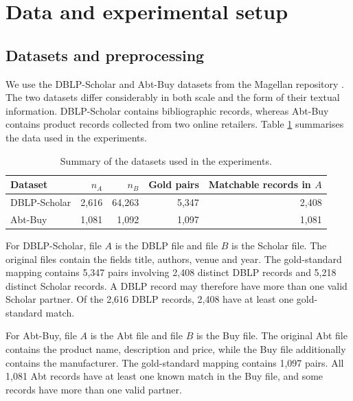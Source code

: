 \section{Data and experimental setup}
\label{sec:experimental-setup}

\subsection{Datasets and preprocessing}
\label{sec:data}

We use the DBLP-Scholar and Abt-Buy datasets from the Magellan repository
\citep{konda2016magellan}. The two datasets differ considerably in both scale and
the form of their textual information. DBLP-Scholar contains bibliographic records,
whereas Abt-Buy contains product records collected from two online retailers.
Table \ref{tab:dataset-summary} summarises the data used in the experiments.

\begin{table}[ht]
\centering
\caption{Summary of the datasets used in the experiments.}
\begin{tabular}{lrrrr}
\toprule
Dataset & $n_A$ & $n_B$ & Gold pairs & Matchable records in $A$ \\
\midrule
DBLP-Scholar & 2,616 & 64,263 & 5,347 & 2,408 \\
Abt-Buy      & 1,081 & 1,092  & 1,097 & 1,081 \\
\bottomrule
\end{tabular}
\label{tab:dataset-summary}
\end{table}

For DBLP-Scholar, file $A$ is the DBLP file and file $B$ is the Scholar
file. The original files contain the fields title, authors, venue and year.
The gold-standard mapping contains 5,347 pairs involving 2,408 distinct
DBLP records and 5,218 distinct Scholar records. A DBLP record may therefore
have more than one valid Scholar partner. Of the 2,616 DBLP records, 2,408
have at least one gold-standard match.

For Abt-Buy, file $A$ is the Abt file and file $B$ is the Buy file. The
original Abt file contains the product name, description and price, while the
Buy file additionally contains the manufacturer. The gold-standard mapping
contains 1,097 pairs. All 1,081 Abt records have at least one known match in
the Buy file, and some records have more than one valid partner.

